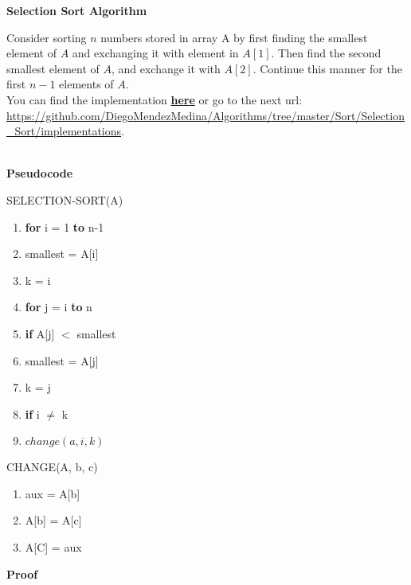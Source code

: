 \documentclass[12pt, twoside, a4paper]{article}
\begin{document}
\begin{center}
  {\large \bfseries Selection Sort Algorithm \par}
\end{center}
Consider sorting $n$ numbers stored in array A by first finding the smallest element of $A$ and exchanging it with element in $A[1]$. Then find the second
smallest element of $A$, and exchange it with $A[2]$. Continue this manner
 for the first $n-1$ elements of $A$.\\
 You can find the implementation \href{https://github.com/DiegoMendezMedina/Algorithms/tree/master/Sort/Selection_Sort/implementations}{\textbf{here}}
 or go to the next url: \url{https://github.com/DiegoMendezMedina/Algorithms/tree/master/Sort/Selection_Sort/implementations}. \\ \\
  \begin{center}
    {\large \textbf{Pseudocode} \par}
  \end{center}
  SELECTION-SORT(A)
  \begin{enumerate}
  \item \textbf{for} i = 1 \textbf{to} n-1
  \item \hspace{.5cm} smallest = A[i]
  \item \hspace{.5cm} k = i
  \item \hspace{.5cm} \textbf{for} j = i \textbf{to} n
  \item \hspace{1cm} \textbf{if} A[j] $<$ smallest
  \item \hspace{1.5cm} smallest = A[j]
  \item \hspace{1.5cm} k = j
  \item \hspace{.5cm} \textbf{if} i $\neq$  k
  \item \hspace{1cm} $change(a, i, k)$
  \end{enumerate}
  CHANGE(A, b, c)
  \begin{enumerate}
  \item aux = A[b]
  \item A[b] = A[c]
  \item A[C] = aux
  \end{enumerate}
  \newpage
  \begin{center}
        {\large \textbf{Proof} \par}
  \end{center}
\end{document}
